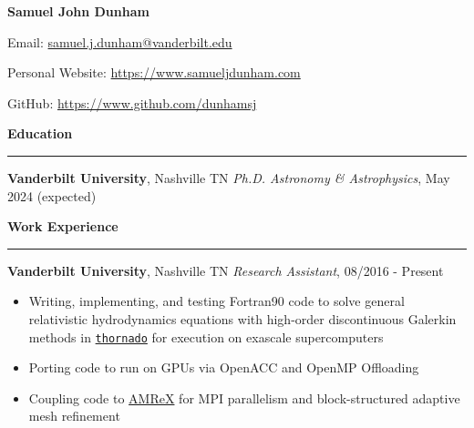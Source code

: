 \documentclass[10pt]{article}
\begin{document}
\flushleft

{\large \textbf{Samuel John Dunham}}
\vspace{1em}

Email: \href{mailto:samuel.j.dunham@vanderbilt.edu}%
                   {samuel.j.dunham@vanderbilt.edu}
\vspace{0.5em}

Personal Website: \url{https://www.samueljdunham.com}
\vspace{0.5em}

GitHub: \url{https://www.github.com/dunhamsj}

\vspace{1em}

\textbf{Education}\vspace{0.5em}\hrule\vspace{1em}

\textbf{Vanderbilt University}, Nashville TN\newline
\textit{Ph.D. Astronomy \& Astrophysics}, May 2024 (expected)
\vspace{1em}

\textbf{Work Experience}\vspace{0.5em}\hrule\vspace{1em}

\textbf{Vanderbilt University}, Nashville TN\newline
\textit{Research Assistant}, 08/2016 - Present
\begin{itemize}\setlength\itemsep{0.1cm}
  \item
    Writing, implementing, and testing
    Fortran90 code to solve general relativistic hydrodynamics
    equations with high-order discontinuous Galerkin methods
    in \href{https://www.github.com/endeve/thornado}{\texttt{thornado}}
    for execution on exascale supercomputers
  \item
    Porting code to run on GPUs via OpenACC and OpenMP Offloading
  \item
    Coupling code to \href{https://www.github.com/AMReX-Codes/amrex}{AMReX}
    for MPI parallelism and block-structured adaptive mesh refinement
\end{itemize}
\vspace{1em}
\end{document}

